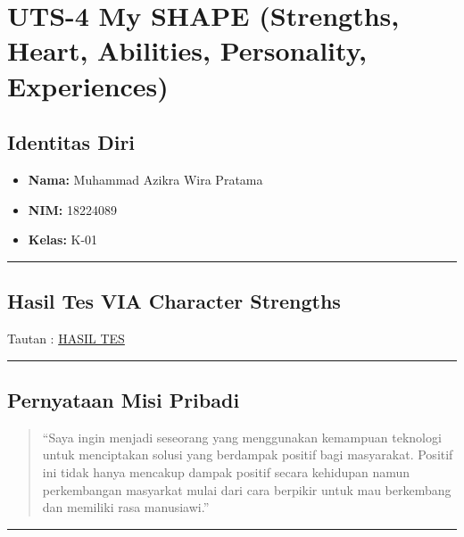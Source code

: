 \documentclass[
  letterpaper,
  DIV=11,
  numbers=noendperiod]{scrreprt}
\providecommand{\tightlist}{%
  \setlength{\itemsep}{0pt}\setlength{\parskip}{0pt}}
\begin{document}

\chapter{UTS-4 My SHAPE (Strengths, Heart, Abilities, Personality,
Experiences)}\label{uts-4-my-shape-strengths-heart-abilities-personality-experiences}

\section{Identitas Diri}\label{identitas-diri-1}

\begin{itemize}
\tightlist
\item
  \textbf{Nama:} Muhammad Azikra Wira Pratama\\
\item
  \textbf{NIM:} 18224089
\item
  \textbf{Kelas:} K-01
\end{itemize}

\begin{center}\rule{0.5\linewidth}{0.5pt}\end{center}

\section{Hasil Tes VIA Character
Strengths}\label{hasil-tes-via-character-strengths}

Tautan : \href{StrengthsProfile-MuhammadAzikra-WiraPratama.pdf}{HASIL
TES}

\begin{center}\rule{0.5\linewidth}{0.5pt}\end{center}

\section{Pernyataan Misi Pribadi}\label{pernyataan-misi-pribadi}

\begin{quote}
``Saya ingin menjadi seseorang yang menggunakan kemampuan teknologi
untuk menciptakan solusi yang berdampak positif bagi masyarakat. Positif
ini tidak hanya mencakup dampak positif secara kehidupan namun
perkembangan masyarkat mulai dari cara berpikir untuk mau berkembang dan
memiliki rasa manusiawi.''
\end{quote}

\begin{center}\rule{0.5\linewidth}{0.5pt}\end{center}
\end{document}
